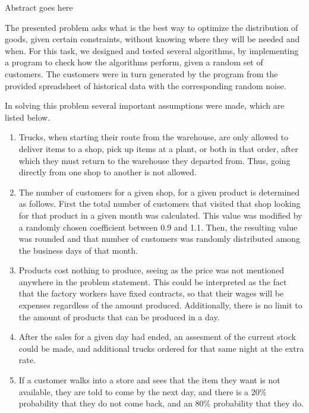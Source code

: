 
\physics

\begin{paperabs}
Abstract goes here
\end{paperabs}
\begin{paper}

The presented problem asks what is the best way to optimize the distribution of
goods, given certain constraints, without knowing where they will be needed and
when.
For this task, we designed and tested several algorithms, by implementing a
program to check how the algorithms perform, given a random set of customers.
The customers were in turn generated by the program from the provided
spreadsheet of historical data with the corresponding random noise.

In solving this problem several important assumptions were made, which are
listed below.
\begin{enumerate}
\item
Trucks, when starting their route from the warehouse, are only allowed to
deliver items to a shop, pick up items at a plant, or both in that order, after
which they must return to the warehouse they departed from.
Thus, going directly from one shop to another is not allowed.
\item
The number of customers for a given shop, for a given product is determined
as follows.
First the total number of customers that visited that shop looking for that
product in a given month was calculated.
This value was modified by a randomly chosen coefficient between 0.9 and 1.1.
Then, the resulting value was rounded and that number of customers was randomly
distributed among the business days of that month.
\item
Products cost nothing to produce, seeing as the price was
not mentioned anywhere in the problem statement.
This could be interpreted as the fact that the factory workers have fixed
contracts, so that their wages will be expenses regardless of the amount
produced.
Additionally, there is no limit to the amount of products that can be produced
in a day.
\item
After the sales for a given day had ended, an assesment of the current stock
could be made, and additional trucks ordered for that same night at the extra
rate.
\item
If a customer walks into a store and sees that the item they want is not
available, they are told to come by the next day, and there is a 20\%
probability that they do not come back, and an 80\% probability that they do.
\end{enumerate}


\end{paper}
